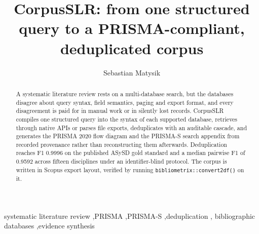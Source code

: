 \documentclass[final,5p,times,twocolumn]{elsarticle}
\begin{document}
\begin{frontmatter}

\title{CorpusSLR: from one structured query to a PRISMA-compliant,
deduplicated corpus}

\author[a]{Sebastian Matysik}
\address[a]{University of Szczecin, Institute of Management, Doctoral School, Szczecin, Poland}

\begin{abstract}
A systematic literature review rests on a multi-database search, but the
databases disagree about query syntax, field semantics, paging and export
format, and every disagreement is paid for in manual work or in silently lost
records. CorpusSLR compiles one structured query into the syntax of each
supported database, retrieves through native APIs or parses file exports,
deduplicates with an auditable cascade, and generates the PRISMA 2020 flow
diagram and the PRISMA-S search appendix from recorded provenance rather than
reconstructing them afterwards. Deduplication reaches F1 0.9996 on the
published ASySD gold standard and a median pairwise F1 of 0.9592 across fifteen
disciplines under an identifier-blind protocol. The corpus is written in Scopus
export layout, verified by running \texttt{bibliometrix::convert2df()} on it.
\end{abstract}

\begin{keyword}
systematic literature review \sep PRISMA \sep PRISMA-S \sep deduplication \sep
bibliographic databases \sep evidence synthesis
\end{keyword}

\end{frontmatter}
\end{document}

